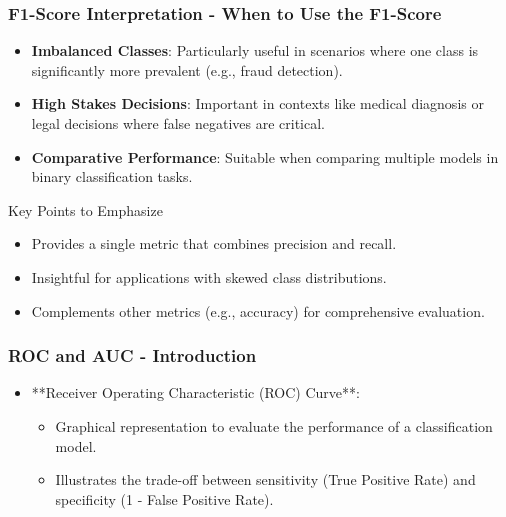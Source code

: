 \documentclass[aspectratio=169]{beamer}
\begin{document}
\begin{frame}[fragile]
    \frametitle{F1-Score Interpretation - When to Use the F1-Score}
    \begin{itemize}
        \item \textbf{Imbalanced Classes}: Particularly useful in scenarios where one class is significantly more prevalent (e.g., fraud detection).
        \item \textbf{High Stakes Decisions}: Important in contexts like medical diagnosis or legal decisions where false negatives are critical.
        \item \textbf{Comparative Performance}: Suitable when comparing multiple models in binary classification tasks.
    \end{itemize}

    \begin{block}{Key Points to Emphasize}
        \begin{itemize}
            \item Provides a single metric that combines precision and recall.
            \item Insightful for applications with skewed class distributions.
            \item Complements other metrics (e.g., accuracy) for comprehensive evaluation.
        \end{itemize}
    \end{block}
\end{frame}

\begin{frame}[fragile]
    \frametitle{ROC and AUC - Introduction}
    \begin{itemize}
        \item **Receiver Operating Characteristic (ROC) Curve**:
            \begin{itemize}
                \item Graphical representation to evaluate the performance of a classification model.
                \item Illustrates the trade-off between sensitivity (True Positive Rate) and specificity (1 - False Positive Rate).
            \end{itemize}
    \end{itemize}
\end{frame}
\end{document}
